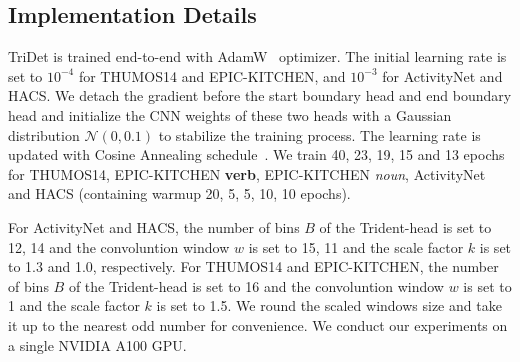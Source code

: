 \documentclass[10pt,twocolumn,letterpaper]{article}
\newcommand{\mc}[1]{\mathcal{#1}}
\begin{document}
\begin{table}[t]
\end{table}


\subsection{Implementation Details}
TriDet is trained end-to-end with AdamW~\cite{loshchilov2018decoupled}
optimizer. The initial learning rate is set to $10^{-4}$ for THUMOS14 and EPIC-KITCHEN, and  $10^{-3}$ for ActivityNet and HACS. We detach the gradient before the start boundary head and end boundary head and initialize the CNN weights of these two heads with a Gaussian distribution $\mc{N}(0, 0.1)$ to stabilize the training process. The learning rate is updated with Cosine Annealing schedule~\cite{loshchilov2017sgdr}. We train 40, 23, 19, 15 and 13 epochs for THUMOS14, EPIC-KITCHEN \textbf{verb}, EPIC-KITCHEN \emph{noun}, ActivityNet and HACS (containing warmup 20, 5, 5, 10, 10 epochs).

For ActivityNet and HACS, the number of bins $B$ of the Trident-head is set to 12, 14 and the convoluntion window $w$ is set to 15, 11 and the scale factor $k$ is set to 1.3 and 1.0, respectively. 
For THUMOS14 and EPIC-KITCHEN, the number of bins $B$ of the Trident-head is set to 16 and the convoluntion window $w$ is set to 1 and the scale factor $k$ is set to 1.5. We round the scaled windows size and take it up to the nearest odd number for convenience. We conduct our experiments on a single NVIDIA A100 GPU. 
\end{document}
